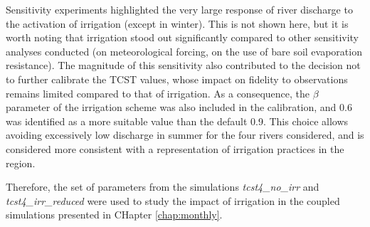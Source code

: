 Sensitivity experiments highlighted the very large response of river discharge to the activation of irrigation (except in winter). 
This is not shown here, %
but it is worth noting that irrigation stood out significantly compared to other sensitivity analyses conducted (on meteorological forcing, on the use of bare soil evaporation resistance). 
The magnitude of this sensitivity also contributed to the decision not to further calibrate the TCST values, whose impact on fidelity to observations remains limited compared to that of irrigation.
As a consequence, the $\beta$ parameter of the irrigation scheme was also included in the calibration, and 0.6 was identified as a more suitable value than the default 0.9. This choice allows avoiding excessively low discharge in summer for the four rivers considered, and is considered more consistent with a representation of irrigation practices in the region.

Therefore, the set of parameters from the simulations \textit{tcst4\_no\_irr} and \textit{tcst4\_irr\_reduced} were used to study the impact of irrigation in the coupled simulations presented in CHapter \ref{chap:monthly}.

